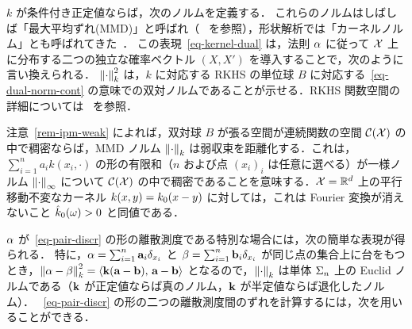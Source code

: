 $k$ が条件付き正定値ならば，次のノルムを定義する．
これらのノルムはしばしば「最大平均ずれ(MMD)」と呼ばれ（~\citep{gretton2007kernel} を参照），形状解析では「カーネルノルム」とも呼ばれてきた~\citep{glaunes2004diffeomorphic}．
%
この表現~\eqref{eq-kernel-dual} は，法則 $\alpha$ に従って $\mathcal{X}$ 上に分布する二つの独立な確率ベクトル $(X,X')$ を導入することで，次のように言い換えられる．
$\left\| \cdot \right\|^2_{k}$ は，$k$ に対応する RKHS の単位球 $B$ に対応する~\eqref{eq-dual-norm-cont} の意味での双対ノルムであることが示せる．RKHS 関数空間の詳細については~\citep{berlinet03reproducing,Hofmann2008,scholkopf2002learning} を参照．

\begin{rem}[普遍カーネル]
注意~\ref{rem-ipm-weak} によれば，双対球 $B$ が張る空間が連続関数の空間 $\mathcal{C}(\mathcal{X})$ の中で稠密ならば，MMD ノルム $\left\| \cdot \right\|_k$ は弱収束を距離化する．これは，$\sum_{i=1}^n a_i k(x_i,\cdot)$ の形の有限和（$n$ および点 $(x_i)_i$ は任意に選べる）が一様ノルム $\left\| \cdot \right\|_\infty$ について $\mathcal{C}(\mathcal{X})$ の中で稠密であることを意味する．$\mathcal{X}=\mathbb{R}^d$ 上の平行移動不変なカーネル $k(x,y)=k_0(x-y)$ に対しては，これは Fourier 変換が消えないこと $\hat {k}_0(\omega) >0$ と同値である．
\end{rem}

$\alpha$ が~\eqref{eq-pair-discr} の形の離散測度である特別な場合には，次の簡単な表現が得られる．
特に，$\alpha=\sum_{i=1}^n \mathrm{\textbf{a}}_i \delta_{x_i}$ と $\beta=\sum_{i=1}^n \mathrm{\textbf{b}}_i \delta_{x_i}$ が同じ点の集合上に台をもつとき，$\left\| \alpha-\beta \right\|_{k}^2 = \langle \mathrm{\textbf{k}}(\mathrm{\textbf{a}}-\mathrm{\textbf{b}}),\,\mathrm{\textbf{a}}-\mathrm{\textbf{b}}\rangle$ となるので，$\left\| \cdot \right\|_{k}$ は単体 $\Sigma_n$ 上の Euclid ノルムである（$\mathrm{\textbf{k}}$ が正定値ならば真のノルム，$\mathrm{\textbf{k}}$ が半定値ならば退化したノルム）．
%
~\eqref{eq-pair-discr} の形の二つの離散測度間のずれを計算するには，次を用いることができる．

